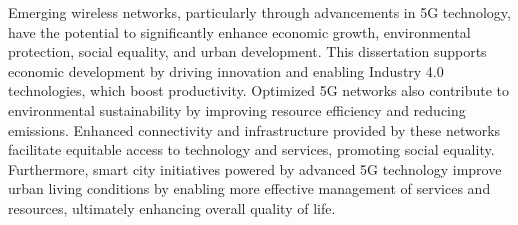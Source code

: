 Emerging wireless networks, particularly through advancements in 5G technology, have the potential to significantly enhance economic growth, environmental protection, social equality, and urban development.
This dissertation supports economic development by driving innovation and enabling Industry 4.0 technologies, which boost productivity.
Optimized 5G networks also contribute to environmental sustainability by improving resource efficiency and reducing emissions.
Enhanced connectivity and infrastructure provided by these networks facilitate equitable access to technology and services, promoting social equality.
Furthermore, smart city initiatives powered by advanced 5G technology improve urban living conditions by enabling more effective management of services and resources, ultimately enhancing overall quality of life.